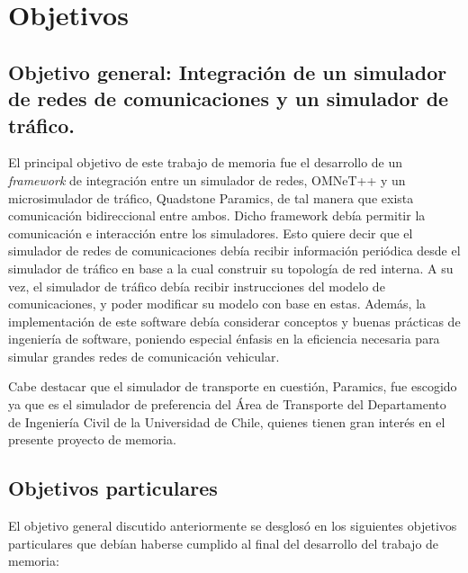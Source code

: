 \section{Objetivos}\label{sec:obj}

\subsection{Objetivo general: Integración de un simulador de redes de comunicaciones y un simulador de tráfico.}

El principal objetivo de este trabajo de memoria fue el desarrollo de un \textit{framework} de integración entre un simulador de redes, OMNeT++ y un microsimulador de tráfico, Quadstone Paramics, de tal manera que exista comunicación bidireccional entre ambos. Dicho framework debía permitir la comunicación e interacción entre los simuladores. Esto quiere decir que el simulador de redes de comunicaciones debía recibir información periódica desde el simulador de tráfico en base a la cual construir su topología de red interna. A su vez, el simulador de tráfico debía recibir instrucciones del modelo de comunicaciones, y poder modificar su modelo con base en estas.
Además, la implementación de este software debía considerar conceptos y buenas prácticas de ingeniería de software, poniendo especial énfasis en la eficiencia necesaria para simular grandes redes de comunicación vehicular.

Cabe destacar que el simulador de transporte en cuestión, Paramics, fue escogido ya que es el simulador de preferencia del Área de Transporte del Departamento de Ingeniería Civil de la Universidad de Chile, quienes tienen gran interés en el presente proyecto de memoria.


\subsection{Objetivos particulares}\label{sec:obj:part}

El objetivo general discutido anteriormente se desglosó en los siguientes objetivos particulares que debían haberse cumplido al final del desarrollo del trabajo de memoria:

